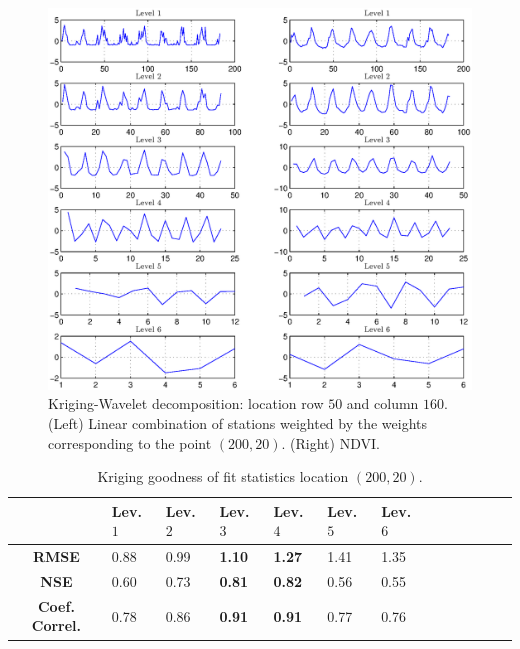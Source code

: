 \documentclass[10pt,letterpaper,conference]{ieeeconf}
\begin{document}
\begin{figure}[ht]
\begin{center}
\includegraphics[width=\columnwidth]{point200_20Kriging}
\vspace*{-0.2in}
\caption{Kriging-Wavelet decomposition: location row $50$ and column $160$. 
(Left) Linear combination of stations weighted by the weights corresponding to 
the point $(200,20)$. (Right) NDVI.}
\label{fig:level_decomposition6}
\end{center}
\end{figure}
\begin{table}[ht] 
\caption{Kriging goodness of fit statistics location $(200,20)$.}
\vspace*{-0.15in}
\label{table:Krig_goddness_200_20}
\vskip4mm
\centering
\begin{tabularx}{\columnwidth}{@{}>{\bfseries}c*{12}{X}@{}}
\hline \hline
 & Lev. $1$ & Lev. $2$ & Lev. $3$ & Lev. $4$ & Lev. $5$ & Lev. 
$6$ \\
\hline \hline
RMSE & 0.88&0.99&{\bf 1.10}&{\bf 1.27} &1.41&1.35\\
\hline
NSE & 0.60&0.73&{\bf 0.81}& {\bf 0.82}&0.56&0.55 \\
\hline
Coef. Correl. &0.78&0.86&{\bf 0.91}&{\bf 0.91}&0.77&0.76 \\
\hline
\end{tabularx}
\end{table}
\end{document}

